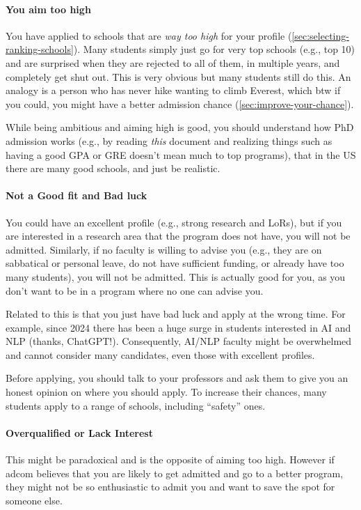 \documentclass[oneside,11pt,dvipsnames]{book}
\begin{document}
\paragraph{You aim too high} 
You have applied to schools that are \emph{way too high} for your profile (\autoref{sec:selecting-ranking-schools}). Many students simply just go for very top schools (e.g., top 10) and are surprised when they are rejected to all of them, in multiple years, and completely get shut out.  This is very obvious but many students still do this. An analogy is a person who has never hike wanting to climb Everest, which btw if you could, you might have a better admission chance (\autoref{sec:improve-your-chance}).

While being ambitious and aiming high is good, you should understand how PhD admission works (e.g., by reading \emph{this} document and realizing things such as having a good GPA or GRE doesn't mean much to top programs), that in the US there are many good schools, and just be realistic. 

\paragraph{Not a Good fit and Bad luck}  You could have an excellent profile (e.g., strong research and LoRs), but if you are interested in a research area that the program does not have, you will not be admitted.
Similarly, if no faculty is willing to advise you (e.g., they are on sabbatical or personal leave, do not have sufficient funding, or already have too many students), you will not be admitted.  This is actually good for you, as you don't want to be in a program where no one can advise you.

Related to this is that you just have bad luck and apply at the wrong time.  For example, since 2024 there has been a huge surge in students interested in AI and NLP (thanks, ChatGPT!). Consequently, AI/NLP faculty might be overwhelmed and cannot consider many candidates, even those with excellent profiles.



Before applying, you should talk to your professors and ask them to give you an honest opinion on where you should apply. To increase their chances, many students apply to a range of schools, including ``safety'' ones. 


\paragraph{Overqualified or Lack Interest}  This might be paradoxical and is the opposite of aiming too high. However if adcom believes that you are likely to get admitted and go to a better program, they might not be so enthusiastic to admit you and want to save the spot for someone else.
\end{document}
